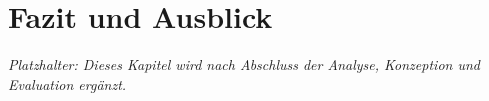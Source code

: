 
\chapter{Fazit und Ausblick}\label{fazit-und-ausblick}

\textit{Platzhalter: Dieses Kapitel wird nach Abschluss der Analyse,
Konzeption und Evaluation ergänzt.}
